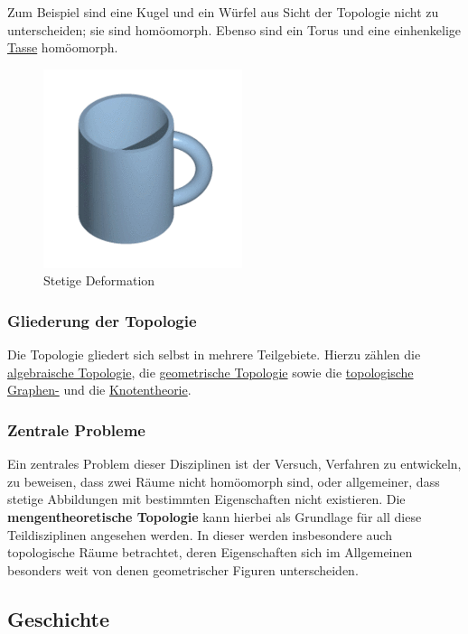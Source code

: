 \documentclass[12pt,]{article}
\begin{document}
Zum Beispiel sind eine Kugel und ein Würfel aus Sicht der Topologie
nicht zu unterscheiden; sie sind homöomorph. Ebenso sind ein Torus und
eine einhenkelige \url{Tasse} homöomorph.

\begin{figure}[htbp]
\centering
\includegraphics{./images/mugmorph.gif}
\caption{Stetige Deformation}
\end{figure}

\subsubsection{Gliederung der Topologie}\label{gliederung-der-topologie}

Die Topologie gliedert sich selbst in mehrere Teilgebiete. Hierzu zählen
die \href{algebraische_Topologie}{algebraische Topologie}, die
\href{geometrische_Topologie}{geometrische Topologie} sowie die
\href{Topologische_Graphentheorie}{topologische Graphen-} und die
\url{Knotentheorie}.

\subsubsection{Zentrale Probleme}\label{zentrale-probleme}

Ein zentrales Problem dieser Disziplinen ist der Versuch, Verfahren zu
entwickeln, zu beweisen, dass zwei Räume nicht homöomorph sind, oder
allgemeiner, dass stetige Abbildungen mit bestimmten Eigenschaften nicht
existieren. Die \textbf{mengentheoretische Topologie} kann hierbei als
Grundlage für all diese Teildisziplinen angesehen werden. In dieser
werden insbesondere auch topologische Räume betrachtet, deren
Eigenschaften sich im Allgemeinen besonders weit von denen geometrischer
Figuren unterscheiden.

\subsection{Geschichte}\label{geschichte}
\end{document}
